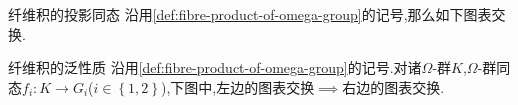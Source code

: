 \begin{proposition}{纤维积的投影同态}{}
	沿用\cref{def:fibre-product-of-omega-group}的记号,那么如下图表交换.
	\begin{center}
	\end{center}
\end{proposition}

\begin{proposition}{纤维积的泛性质}{}
	沿用\cref{def:fibre-product-of-omega-group}的记号.对诸$\Omega$-群$K$,$\Omega$-群同态$f_{i}:K\to G_{i}$($i\in\left\{1,2\right\}$),下图中,左边的图表交换$\implies$右边的图表交换.
	\begin{center}
	\end{center}
\end{proposition}









































